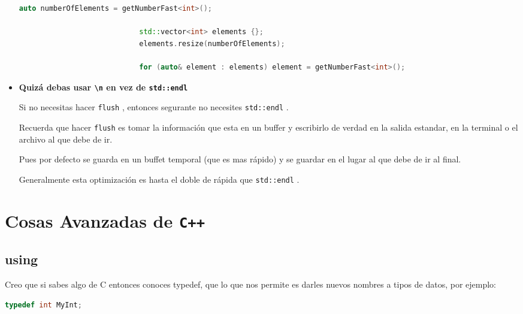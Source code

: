 \documentclass[12pt, fleqn]{report}                             %
\theoremstyle{break}                                            %
\newcommand{\textCode}[1]  { \texttt{#1} }                      %
\newcommand{\Cpp}{\ignorespaces\textCode{C++}}                  %
\begin{document}
\begin{itemize}
\begin{lstlisting}[language=C++, gobble=28]
                            auto numberOfElements = getNumberFast<int>();

                            std::vector<int> elements {};
                            elements.resize(numberOfElements);

                            for (auto& element : elements) element = getNumberFast<int>();
                        \end{lstlisting}

                    \item \textbf{Quizá debas usar \textCode{\textbackslash n} en vez de \textCode{std::endl}}
                        
                        Si no necesitas hacer \textCode{flush}, entonces segurante no necesites
                        \textCode{std::endl}.
                        
                        Recuerda que hacer \textCode{flush} es tomar la información que 
                        esta en un buffer y escribirlo de verdad en la salida estandar, en la terminal 
                        o el archivo al que debe de ir.

                        Pues por defecto se guarda en un buffet temporal (que es mas rápido) 
                        y se guardar en el lugar al que debe de ir al final.

                        Generalmente esta optimización es hasta el doble de rápida que \textCode{std::endl}.
                \end{itemize}


    \clearpage
    \chapter{Cosas Avanzadas de \Cpp}

        \clearpage
        \section{using}  

            Creo que si sabes algo de C entonces conoces typedef, que lo que nos permite es darles nuevos nombres a 
            tipos de datos, por ejemplo:
            \begin{lstlisting}[language=C++, gobble=16]
                typedef int MyInt;
            \end{lstlisting}
\end{document}
